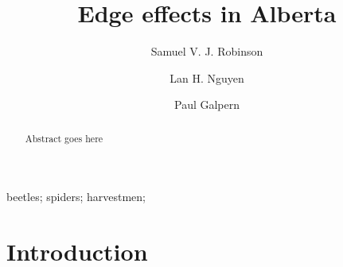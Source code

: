 \documentclass[]{elsarticle} %
\begin{document}
\begin{frontmatter}

  \title{Edge effects in Alberta}
    \author[University of Calgary]{Samuel V. J. Robinson}
    \author[University of Calgary]{Lan H. Nguyen}
    \author[University of Calgary]{Paul Galpern}
      \address[University of Calgary]{2500 University Drive NW, Calgary, AB}
  
  \begin{abstract}
  Abstract goes here
  \end{abstract}
   \begin{keyword} beetles; spiders; harvestmen;\end{keyword}
 \end{frontmatter}

\newpage
\doublespacing

\hypertarget{introduction}{%
\section{Introduction}\label{introduction}}
\end{document}
